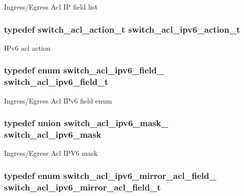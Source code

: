 Ingress/\+Egress Acl I\+P field list \hypertarget{group__ACL_gad961512bfbd05e0d75cc0e114e8c16fa}{
\subsubsection[{switch\+\_\+acl\+\_\+ipv6\+\_\+action\+\_\+t}]{\setlength{\rightskip}{0pt plus 5cm}typedef {\bf switch\+\_\+acl\+\_\+action\+\_\+t} {\bf switch\+\_\+acl\+\_\+ipv6\+\_\+action\+\_\+t}}}\label{group__ACL_gad961512bfbd05e0d75cc0e114e8c16fa}
I\+Pv6 acl action \hypertarget{group__ACL_gac21b1f90cca1d5f3305169407ebfd0ed}{
\subsubsection[{switch\+\_\+acl\+\_\+ipv6\+\_\+field\+\_\+t}]{\setlength{\rightskip}{0pt plus 5cm}typedef enum {\bf switch\+\_\+acl\+\_\+ipv6\+\_\+field\+\_\+}  {\bf switch\+\_\+acl\+\_\+ipv6\+\_\+field\+\_\+t}}}\label{group__ACL_gac21b1f90cca1d5f3305169407ebfd0ed}
Ingress/\+Egress Acl I\+Pv6 field enum \hypertarget{group__ACL_ga598339272a82061bf0816da6e067f505}{
\subsubsection[{switch\+\_\+acl\+\_\+ipv6\+\_\+mask}]{\setlength{\rightskip}{0pt plus 5cm}typedef union {\bf switch\+\_\+acl\+\_\+ipv6\+\_\+mask\+\_\+}  {\bf switch\+\_\+acl\+\_\+ipv6\+\_\+mask}}}\label{group__ACL_ga598339272a82061bf0816da6e067f505}
Ingress/\+Egress Acl I\+P\+V6 mask \hypertarget{group__ACL_gaae7e0c4f916d7237b7ebbdd8d6608110}{
\subsubsection[{switch\+\_\+acl\+\_\+ipv6\+\_\+mirror\+\_\+acl\+\_\+field\+\_\+t}]{\setlength{\rightskip}{0pt plus 5cm}typedef enum {\bf switch\+\_\+acl\+\_\+ipv6\+\_\+mirror\+\_\+acl\+\_\+field\+\_\+}  {\bf switch\+\_\+acl\+\_\+ipv6\+\_\+mirror\+\_\+acl\+\_\+field\+\_\+t}}}\label{group__ACL_gaae7e0c4f916d7237b7ebbdd8d6608110}
